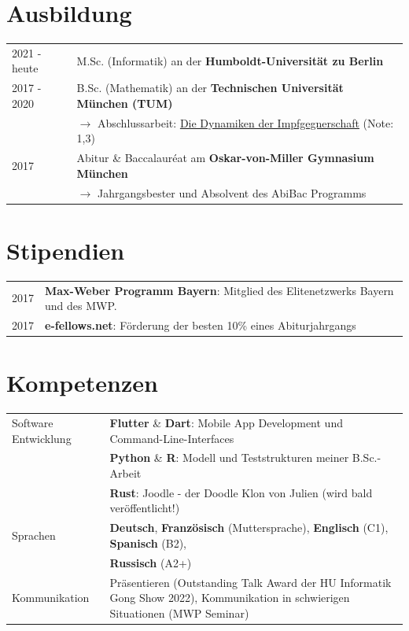 \documentclass[a4paper,12pt]{article}
\begin{document}
\section{Ausbildung}
\begin{tabularx}{\linewidth}{@{}l X@{}}	
2021 - heute & M.Sc. (Informatik) an der \textbf{Humboldt-Universität zu Berlin} \hfill \normalsize \\

2017 - 2020 & B.Sc. (Mathematik) an der \textbf{Technischen Universität München (TUM)}\hfill \\ 
&\phantom{ }$\rightarrow$ Abschlussarbeit: \href{https://julienandco.github.io/the-dynamics-of-vaccine-hesitancy/bachelor_thesis_julien_caselmann.pdf}{Die Dynamiken der Impfgegnerschaft} (Note: 1,3) \\
2017 & Abitur \& Baccalauréat am \textbf{Oskar-von-Miller Gymnasium München} \hfill \\
&\phantom{ }$\rightarrow$ Jahrgangsbester und Absolvent des AbiBac Programms
\end{tabularx}

\section{Stipendien}
\begin{tabularx}{\linewidth}{@{}l X@{}}
2017 &  \normalsize{\textbf{Max-Weber Programm Bayern}: Mitglied des Elitenetzwerks Bayern und des MWP.}\\
2017 &  \normalsize{\textbf{e-fellows.net}: Förderung der besten 10\% eines Abiturjahrgangs}\\  
\end{tabularx}

\section{Kompetenzen}
\begin{tabularx}{\linewidth}{@{}l X@{}}
Software Entwicklung &  \normalsize{\textbf{Flutter} \& \textbf{Dart}: Mobile App Development und Command-Line-Interfaces}\\
& \normalsize{\textbf{Python} \& \textbf{R}: Modell und Teststrukturen meiner B.Sc.-Arbeit}\\
& \normalsize{\textbf{Rust}: Joodle - der Doodle Klon von Julien (wird bald veröffentlicht!)}\\
Sprachen &  \normalsize{\textbf{Deutsch}, \textbf{Französisch} (Muttersprache), \textbf{Englisch} (C1), \textbf{Spanisch} (B2),}\\  
& \normalsize{\textbf{Russisch} (A2+)}\\
Kommunikation &  \normalsize{Präsentieren (Outstanding Talk Award der HU Informatik Gong Show 2022), Kommunikation in schwierigen Situationen (MWP Seminar)}\\  
\end{tabularx}

\vfill
{}
\end{document}
